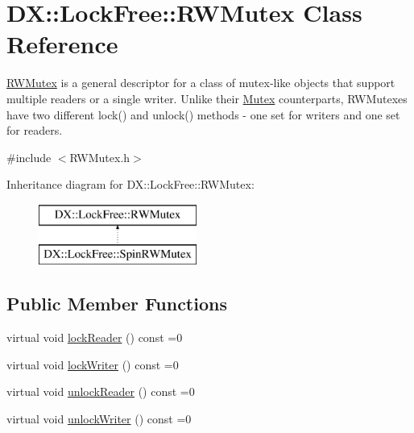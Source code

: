 \hypertarget{class_d_x_1_1_lock_free_1_1_r_w_mutex}{\section{D\-X\-:\-:Lock\-Free\-:\-:R\-W\-Mutex Class Reference}
\label{class_d_x_1_1_lock_free_1_1_r_w_mutex}
}


\hyperlink{class_d_x_1_1_lock_free_1_1_r_w_mutex}{R\-W\-Mutex} is a general descriptor for a class of mutex-\/like objects that support multiple readers or a single writer. Unlike their \hyperlink{class_d_x_1_1_lock_free_1_1_mutex}{Mutex} counterparts, R\-W\-Mutexes have two different lock() and unlock() methods -\/ one set for writers and one set for readers.  




{\ttfamily \#include $<$R\-W\-Mutex.\-h$>$}

Inheritance diagram for D\-X\-:\-:Lock\-Free\-:\-:R\-W\-Mutex\-:\begin{figure}[H]
\begin{center}
\leavevmode
\includegraphics[height=2.000000cm]{class_d_x_1_1_lock_free_1_1_r_w_mutex}
\end{center}
\end{figure}
\subsection*{Public Member Functions}
\begin{DoxyCompactItemize}
\item 
virtual void \hyperlink{class_d_x_1_1_lock_free_1_1_r_w_mutex_a52009c1be555162b437e2c53eb3026c4}{lock\-Reader} () const =0
\item 
virtual void \hyperlink{class_d_x_1_1_lock_free_1_1_r_w_mutex_aaa10a03593e166b02c99455645b49800}{lock\-Writer} () const =0
\item 
virtual void \hyperlink{class_d_x_1_1_lock_free_1_1_r_w_mutex_a52ac4bfa7f6104ef271f468f2bb69eae}{unlock\-Reader} () const =0
\item 
virtual void \hyperlink{class_d_x_1_1_lock_free_1_1_r_w_mutex_af5d65dc65d6800b73d93b43cb7de559b}{unlock\-Writer} () const =0
\end{DoxyCompactItemize}


